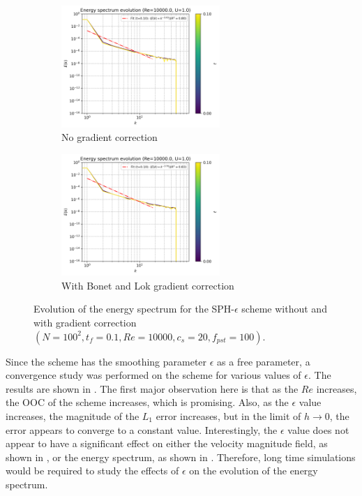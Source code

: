 \begin{figure}[htbp!]
  \begin{subfigure}{7cm}
  \centering\includegraphics[width=6cm]{Code-Figures/mon2017/grad_corr/c0_20_tait_pec_dtmul_1_mkc_no_nx_100_pst_10_re_10000_mon2017/energy_spectrum_evolution.png}
  \caption{No gradient correction}
  \end{subfigure}
  \begin{subfigure}{7cm}
  \centering\includegraphics[width=6cm]{Code-Figures/mon2017/grad_corr/c0_20_tait_pec_dtmul_1_mkc_yes_nx_100_pst_10_re_10000_mon2017/energy_spectrum_evolution.png}
  \caption{With Bonet and Lok gradient correction}
  \end{subfigure}
  \caption{Evolution of the energy spectrum for the SPH-$\epsilon$ scheme without and with gradient correction $(N=100^2, t_f=0.1, Re=10000, c_s=20, f_{pst}=100)$.}
  \label{fig:sph-eps-grad-corr-espec}
\end{figure}

Since the scheme has the smoothing parameter $\epsilon$ as a free parameter, a convergence study was performed on the scheme for various values of $\epsilon$.
The results are shown in . The first major observation here is that as the $Re$ increases, the OOC of the scheme increases, which is promising. Also, as the $\epsilon$ value increases, the magnitude of the $L_1$ error increases, but in the limit of $h \rightarrow 0$, the error appears to converge to a constant value. 
Interestingly, the $\epsilon$ value does not appear to have a significant effect on either the velocity magnitude field, as shown in , or the energy spectrum, as shown in .
Therefore, long time simulations would be required to study the effects of $\epsilon$ on the evolution of the energy spectrum.

